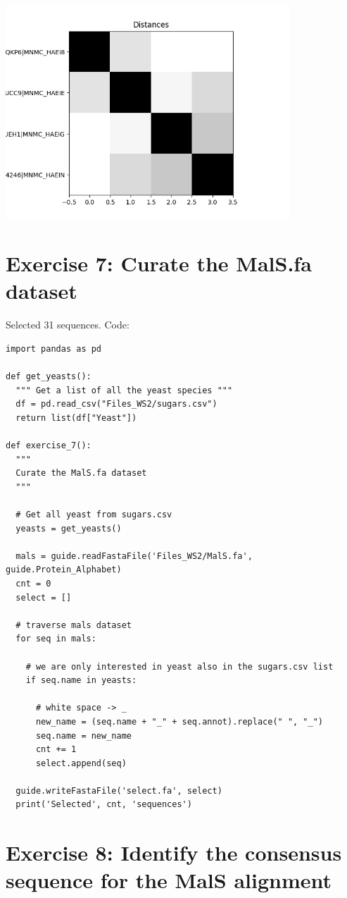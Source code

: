 \documentclass{article} %
\begin{document}
\includegraphics[width=0.8\textwidth]{poisson.png}

\section{Exercise 7: Curate the MalS.fa dataset}

Selected 31 sequences. Code:

\begin{verbatim}
import pandas as pd

def get_yeasts():
  """ Get a list of all the yeast species """
  df = pd.read_csv("Files_WS2/sugars.csv")
  return list(df["Yeast"])

def exercise_7():
  """ 
  Curate the MalS.fa dataset
  """

  # Get all yeast from sugars.csv
  yeasts = get_yeasts()

  mals = guide.readFastaFile('Files_WS2/MalS.fa', guide.Protein_Alphabet)
  cnt = 0
  select = []

  # traverse mals dataset
  for seq in mals:

    # we are only interested in yeast also in the sugars.csv list
    if seq.name in yeasts:

      # white space -> _
      new_name = (seq.name + "_" + seq.annot).replace(" ", "_")
      seq.name = new_name
      cnt += 1
      select.append(seq)

  guide.writeFastaFile('select.fa', select)
  print('Selected', cnt, 'sequences')
\end{verbatim}


\section{Exercise 8: Identify the consensus sequence for the MalS alignment}
\end{document}
